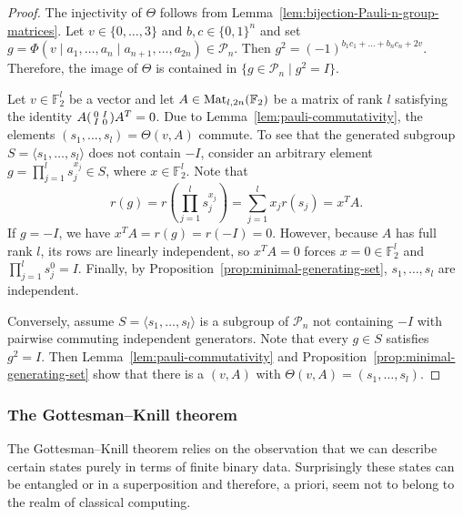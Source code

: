 \documentclass[a4paper, oneside, 12pt]{amsart}
\newcommand*{\PauliGroup}{\ensuremath{\mathcal{P}}}
\begin{document}
\begin{proof}
  The injectivity of \(\Theta\) follows from Lemma~\ref{lem:bijection-Pauli-n-group-matrices}.
  Let \(v\in\{0, \dots , 3\}\) and \(b, c \in\{0,1\}^{n}\) and set \(g = \Phi(v\mid a_{1}, \dots , a_{n} \mid a_{n+1}, \dots , a_{2n}) \in \PauliGroup_{n}\).
  Then \(g^{2}= (-1)^{b_{1}c_{1} + \dots + b_{n}c_{n} + 2v}\).
  Therefore, the image of \(\Theta\) is contained in \(\{ g \in \PauliGroup_{n} \mid g^{2}= I\}\).


  Let \(v\in \mathbb{F}_{2}^{l}\) be a vector and let \(A\in \operatorname{Mat}_{l,2n}( \mathbb{F}_{2})\) be a matrix of rank \(l\) satisfying the identity \(A\begin{psmallmatrix}
    0 & I \\ I & 0
  \end{psmallmatrix}A^{T} = 0\).
  Due to Lemma~\ref{lem:pauli-commutativity}, the  elements \((s_{1}, \dots , s_{l})=\Theta(v,A)\) commute.
  To see that the generated subgroup \(S = \langle s_{1}, \dots , s_{l} \rangle\) does not contain \(-I\), consider an arbitrary element \(g = \prod_{j=1}^l s_j^{x_j}\in S\), where \(x \in \mathbb{F}_2^l\).
  Note that
  \begin{equation*}
    r(g) = r\left( \prod_{j=1}^l s_j^{x_j} \right) = \sum_{j=1}^l x_j r(s_j) = x^{T} A.
  \end{equation*}
  If \(g = -I\), we have  \(x^{T}A = r(g) = r(-I) = 0\).
  However, because \(A\) has full rank \(l\), its rows are linearly independent, so \(x^{T}A = 0\) forces \(x = 0 \in \mathbb{F}_2^l\) and \(\prod_{j=1}^l s_j^{0}=I\).
  Finally, by Proposition~\ref{prop:minimal-generating-set}, \(s_{1}, \dots , s_{l}\) are independent.

  Conversely, assume \(S= \langle s_{1}, \dots , s_{l} \rangle\) is a subgroup of \(\PauliGroup_{n}\) not containing \(-I\) with pairwise commuting independent generators.
  Note that every \(g\in S\) satisfies \(g^{2}=I\).
  Then Lemma~\ref{lem:pauli-commutativity} and Proposition~\ref{prop:minimal-generating-set} show that there is a \((v,A)\) with \(\Theta(v, A) =(s_{1}, \dots , s_{l})\).
\end{proof}

\subsubsection{The Gottesman--Knill theorem}\label{sec:the-gottesman--knill-theorem}
The Gottesman--Knill theorem relies on the observation that we can describe certain states purely in terms of finite binary data.
Surprisingly these states can be entangled or in a superposition and therefore, a priori, seem not to belong to the realm of classical computing.
\end{document}
